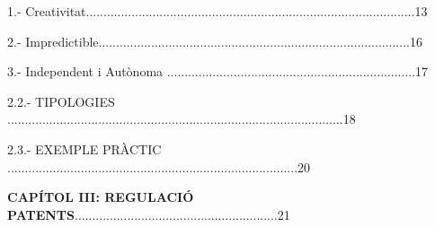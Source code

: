 \documentclass[12pt]{article}
\begin{document}
\vspace{\baselineskip}

\vspace{\baselineskip}
\begin{adjustwidth}{0.49in}{0.0in}
1.- Creativitat..............................................................................................13\par

\end{adjustwidth}


\vspace{\baselineskip}
\begin{adjustwidth}{0.49in}{0.0in}
2.- Impredictible.........................................................................................16\par

\end{adjustwidth}


\vspace{\baselineskip}
\begin{adjustwidth}{0.49in}{0.0in}
3.- Independent i Autònoma .......................................................................17\par

\end{adjustwidth}


\vspace{\baselineskip}

\vspace{\baselineskip}
\begin{justify}
2.2.- TIPOLOGIES ................................................................................................18
\end{justify}\par


\vspace{\baselineskip}
\begin{justify}
2.3.- EXEMPLE PRÀCTIC ...................................................................................20
\end{justify}\par


\vspace{\baselineskip}

\vspace{\baselineskip}
\begin{justify}
\textbf{CAPÍTOL III: REGULACIÓ PATENTS}..........................................................21
\end{justify}\par
\end{document}
